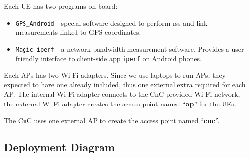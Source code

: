 Each UE has two programs on board:

\begin{itemize}
\tightlist
\item
  \texttt{GPS\_Android} - special software designed to perform \acrshort{rss} and  link measurements linked to GPS coordinates.
\item
  \texttt{Magic\ iperf} - a network bandwidth measurement software.  Provides a user-friendly interface to client-side app \texttt{iperf}  on Android phones.
\end{itemize}

Each APs has two Wi-Fi adapters. Since we use laptops to run APs, they expected to have one already included, thus one external extra required for each AP. The internal Wi-Fi adapter connects to the CnC provided Wi-Fi network, the external Wi-Fi adapter creates the access point named
``\textbf{ap}'' for the UEs.

The CnC uses one external AP to create the access point named
``\textbf{cnc}''.

\subsection{Deployment Diagram}\label{deployment-diagram}

